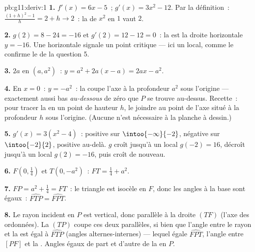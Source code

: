 \begin{solution}{pb:g11:deriv:1}
\textbf{1.} $f'(x) = 6x - 5$~; $g'(x) = 3x^2 - 12$. Par la
définition~: $\frac{(1 + h)^2 - 1}{h} = 2 + h \to 2$~: la  de
$x^2$ en $1$ vaut $2$.

\textbf{2.} $g(2) = 8 - 24 = -16$ et $g'(2) = 12 - 12 = 0$~: la
 est la droite horizontale $y = -16$. Une 
horizontale signale un point critique --- ici un  local,
comme le confirme le  de la question 5.

\textbf{3.}  $2a$ en $(a, a^2)$~:
$y = a^2 + 2a(x - a) = 2ax - a^2$.

\textbf{4.} En $x = 0$~: $y = -a^2$~: la  coupe l'axe à la
profondeur $a^2$ sous l'origine --- exactement aussi bas
\emph{au-dessous} de zéro que $P$ se trouve au-dessus. Recette~:
pour tracer la  en un point de hauteur $h$, le joindre au
point de l'axe situé à la profondeur $h$ sous l'origine. (Aucune
 n'est nécessaire à la planche à dessin.)

\textbf{5.} $g'(x) = 3(x^2 - 4)$~: positive sur
$\intoo{-\infty}{-2}$, négative sur $\intoo{-2}{2}$, positive
au-delà. $g$ croît jusqu'à un  local $g(-2) = 16$, décroît
jusqu'à un  local $g(2) = -16$, puis croît de nouveau.

\textbf{6.} $F\left(0, \frac14\right)$ et $T(0, -a^2)$~:
$FT = \frac14 + a^2$.

\textbf{7.} $FP = a^2 + \frac14 = FT$~: le triangle est isocèle en
$F$, donc les angles à la base sont égaux~:
$\widehat{FTP} = \widehat{FPT}$.

\textbf{8.} Le rayon incident en $P$ est vertical, donc parallèle à
la droite $(TF)$ (l'axe des ordonnées). La  $(TP)$ coupe ces
deux parallèles, si bien que l'angle entre le rayon et la 
est égal à $\widehat{FTP}$ (angles alternes-internes) --- lequel
égale $\widehat{FPT}$, l'angle entre $[PF]$ et la . Angles
égaux de part et d'autre de la  en $P$.


\end{solution}
